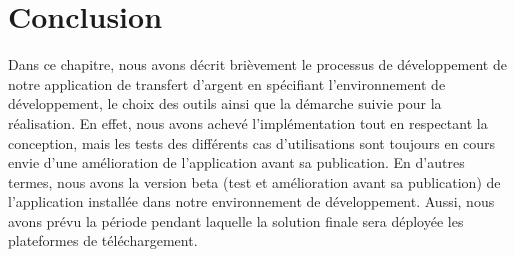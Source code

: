 \chapter*{Conclusion}
Dans ce chapitre, nous avons décrit brièvement le processus de développement de notre application
de transfert d'argent en spécifiant l’environnement de développement, le choix des
outils ainsi que la démarche suivie pour la réalisation.
En effet, nous avons achevé l’implémentation tout en respectant la conception, mais les tests
des différents cas d’utilisations sont toujours en cours envie d’une amélioration de l’application
avant sa publication.
En d’autres termes, nous avons la version beta (test et amélioration avant sa publication) de
l’application installée dans notre environnement de développement. Aussi, nous avons prévu la
période pendant laquelle la solution finale sera déployée les plateformes de téléchargement.